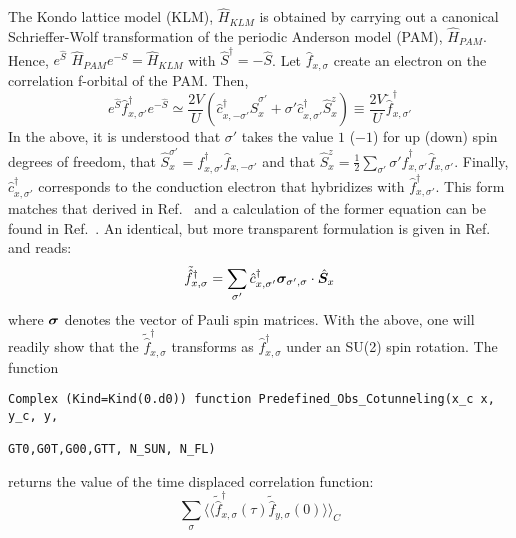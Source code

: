The  Kondo lattice model (KLM), $\hat{H}_{KLM}$   is obtained by carrying out a   canonical Schrieffer-Wolf  \cite{Schrieffer66}  transformation  of the   periodic Anderson model (PAM), $\hat{H}_{PAM}$.    Hence, $e^{\hat{S}}  $ $\hat{H}_{PAM} $$ e^{-S}   = \hat{H}_{KLM}$  with  $\hat{S}^\dagger = - \hat{S}$.     Let $\hat{f}_{x,\sigma} $  create an  electron on the   correlation f-orbital of the   PAM.  Then, 
\begin{equation}
	e^{\hat{S}} \hat{f}^{\dagger}_{x,\sigma'} e^{-\hat{S}}   \simeq  
     \frac{2V}{U}  \left( \hat{c}^{\dagger}_{x,-\sigma'}  \hat{S}^{\sigma'}_{x} +  \sigma'   \hat{c}^{\dagger}_{x,\sigma'} \hat{S}^{z}_x   \right)  \equiv  \frac{2V}{U}   \tilde{\hat{f}}^{\dagger}_{x,\sigma'}    
\end{equation}
In the above, it is understood that $\sigma'$ takes the value $1$ ($-1$)  for up  (down) spin degrees of freedom, that  $  \hat{S}^{\sigma'}_{x} =  f^{\dagger}_{x,\sigma'} \hat{f}^{}_{x,-\sigma'}  $  and that 
$ \hat{S}^{z}_{x} = \frac{1}{2} \sum_{\sigma'}  \sigma' \hat{f}^{\dagger}_{x,\sigma'} \hat{f}^{}_{x,\sigma'} $.  Finally, $\hat{c}^{\dagger}_{x,\sigma'}$ corresponds to the conduction electron that hybridizes with $\hat{f}^{\dagger}_{x,\sigma'}$.  This form matches that derived in Ref.~\cite{Costi00} and a  calculation  of the former equation can be found in Ref.~\cite{Raczkowski18}.  An identical, but more transparent formulation is given in  Ref.~\cite{Maltseva09}   and reads: 
\begin{equation}
 	\tilde{\hat{f}}^{\dagger}_{x,\sigma} = \sum_{\sigma'} \hat{c}^{\dagger}_{x,\sigma'} \boldsymbol{\sigma}_{\sigma',\sigma} \cdot  \hat{\boldsymbol{S}}_x
\end{equation}
where $\ve{\sigma}$  denotes  the vector of Pauli spin matrices.    With the above,  one will readily show that the  $ \tilde{\hat{f}}^{\dagger}_{x,\sigma} $  transforms as  $ \hat{f}^{\dagger}_{x,\sigma} $   under an SU(2)  spin rotation. 
The  function 
\begin{lstlisting}[style=fortran]
Complex (Kind=Kind(0.d0)) function Predefined_Obs_Cotunneling(x_c x, y_c, y,  
                                                          GT0,G0T,G00,GTT, N_SUN, N_FL)
\end{lstlisting}
returns the   value of the time displaced correlation function: 
\begin{equation}
	\sum_{\sigma} \langle \langle   \tilde{\hat{f}}^{\dagger}_{x,\sigma}(\tau)  \tilde{\hat{f}}_{y,\sigma}(0)   \rangle \rangle_{C} 
\end{equation}
$$
